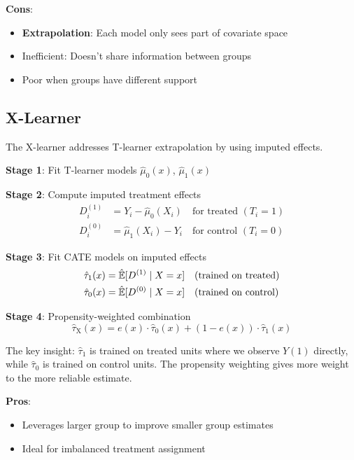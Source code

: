 \textbf{Cons}:
\begin{itemize}
    \item \textbf{Extrapolation}: Each model only sees part of covariate space
    \item Inefficient: Doesn't share information between groups
    \item Poor when groups have different support
\end{itemize}

\subsection{X-Learner}

The X-learner addresses T-learner extrapolation by using imputed effects.

\begin{definition}
\label{def:xlearner}

\textbf{Stage 1}: Fit T-learner models $\hat{\mu}_0(x)$, $\hat{\mu}_1(x)$

\textbf{Stage 2}: Compute imputed treatment effects
\begin{align}
D_i^{(1)} &= Y_i - \hat{\mu}_0(X_i) \quad \text{for treated } (T_i = 1) \\
D_i^{(0)} &= \hat{\mu}_1(X_i) - Y_i \quad \text{for control } (T_i = 0)
\end{align}

\textbf{Stage 3}: Fit CATE models on imputed effects
\begin{align}
\hat{\tau}_1(x) &= \hat{\mathbb{E}}[D^{(1)} \mid X=x] \quad \text{(trained on treated)} \\
\hat{\tau}_0(x) &= \hat{\mathbb{E}}[D^{(0)} \mid X=x] \quad \text{(trained on control)}
\end{align}

\textbf{Stage 4}: Propensity-weighted combination
\begin{equation}
\hat{\tau}_{\text{X}}(x) = e(x) \cdot \hat{\tau}_0(x) + (1 - e(x)) \cdot \hat{\tau}_1(x)
\end{equation}
\end{definition}

The key insight: $\hat{\tau}_1$ is trained on treated units where we observe $Y(1)$ directly, while $\hat{\tau}_0$ is trained on control units. The propensity weighting gives more weight to the more reliable estimate.

\textbf{Pros}:
\begin{itemize}
    \item Leverages larger group to improve smaller group estimates
    \item Ideal for imbalanced treatment assignment
\end{itemize}

